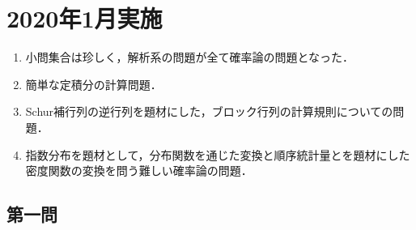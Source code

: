 \documentclass[uplatex,dvipdfmx]{jsarticle}
\begin{document}
\section{2020年1月実施}

\begin{tcolorbox}[colframe=ForestGreen, colback=ForestGreen!10!white,breakable,colbacktitle=ForestGreen!40!white,coltitle=black,fonttitle=\bfseries\sffamily,
    title=概観]
    \begin{enumerate}[{第}1{問}]
        \item 小問集合は珍しく，解析系の問題が全て確率論の問題となった．
        \item 簡単な定積分の計算問題．
        \item Schur補行列の逆行列を題材にした，ブロック行列の計算規則についての問題．
        \item 指数分布を題材として，分布関数を通じた変換と順序統計量とを題材にした密度関数の変換を問う難しい確率論の問題．
    \end{enumerate}
\end{tcolorbox}

\subsection{第一問}
\end{document}
